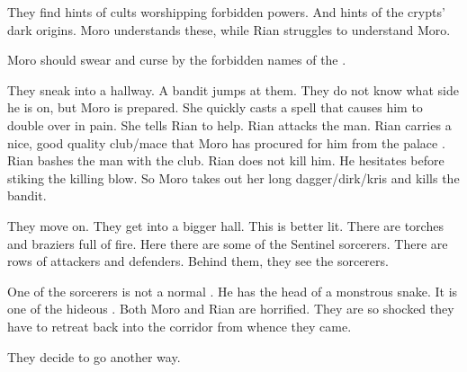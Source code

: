 They find hints of cults worshipping forbidden powers. And hints of the crypts' dark origins. Moro understands these, while Rian struggles to understand Moro. 

Moro should swear and curse by the forbidden names of the \xss.


They sneak into a hallway.
A bandit jumps at them.
They do not know what side he is on, but Moro is prepared. 
She quickly casts a spell that causes him to double over in pain.
She tells Rian to help.
Rian attacks the man.
Rian carries a nice, good quality club/mace that Moro has procured for him from the palace \armoury.
Rian bashes the man with the club. 
Rian does not kill him.
He hesitates before stiking the killing blow. 
So Moro takes out her long dagger/dirk/kris and kills the bandit. 

They move on. 
They get into a bigger hall.
This is better lit. 
There are torches and braziers full of fire. 
Here there are some of the Sentinel sorcerers.
There are rows of attackers and defenders.
Behind them, they see the sorcerers. 

One of the sorcerers is not a normal \scatha.
He has the head of a monstrous snake.
It is one of the hideous \serpentmen. 
Both Moro and Rian are horrified.
They are so shocked they have to retreat back into the corridor from whence they came. 

% 

They decide to go another way. 

